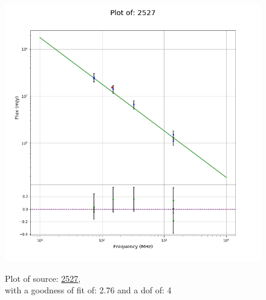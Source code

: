 \documentclass{article}
\begin{document}
\begin{figure}[H]
\begin{minipage}{0.5\textwidth}
        \includegraphics[scale = 0.35]{KmeulenTrap4P23_1hr/1hr2527.png}
        \captionsetup{labelformat=empty}
        \caption{Plot of source: \href{http://banana.transientskp.org/r4/vlo_KmeulenTrap4P23/runningcatalog/2527}{2527},\\with a goodness of fit of: 2.76 and a dof of: 4}
    \addtocounter{figure}{-1}
    \label{KmeulenTrap4P23:1hr:2527:plot}
    \end{minipage}
\end{figure}
\newpage
\end{document}
